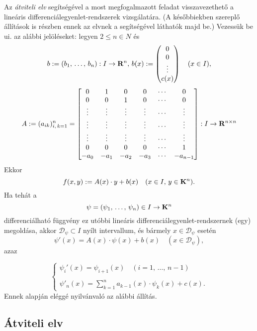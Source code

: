 Az \textit{átviteli elv} segítségével a most megfogalmazott feladat visszavezethető a lineáris differenciálegyenlet-rendszerek vizsgálatára. (A későbbiekben szereplő állítások is részben ennek az elvnek a segítségével láthatók majd be.) Vezessük be ui. az alábbi jelöléseket: legyen $2 \leq n \in N$ és
\[
	b := (b_1, \, \dots, \, b_n) : I \to \mathbf{R}^n, \, b(x) := \begin{pmatrix}
		0 \\
		0 \\
		\vdots \\
		c(x)
	\end{pmatrix} \quad (x \in I),
\]
\[
	A := (a_{ik})_{i, \, k = 1}^n = \begin{bmatrix}
		0 & 1 & 0 & 0 & \cdots & 0 \\
		0 & 0 & 1 & 0 & \cdots & 0 \\
		\vdots & \vdots & \vdots & \vdots & \cdots & \vdots \\
		\vdots & \vdots & \vdots & \vdots & \cdots & \vdots \\
		\vdots & \vdots & \vdots & \vdots & \cdots & \vdots \\
		0 & 0 & 0 & 0 & \cdots & 1 \\
		-a_0 & -a_1 & -a_2 & -a_3 & \cdots & -a_{n-1}
	\end{bmatrix} : I \to \mathbf{R}^{n \times n}
\]
Ekkor
\[
	f(x, y) := A(x) \cdot y + b(x) \quad (x \in I, \, y \in \mathbf{K}^n).
\]
Ha tehát a
\[
	\psi = (\psi_1, \, \dots, \, \psi_n) \in I \to \mathbf{K}^n
\]
differenciálható függvény ez utóbbi lineáris differenciálegyenlet-rendszernek (egy) megoldása, akkor $\mathcal{D}_\psi \subset I$ nyílt intervallum, és bármely $x \in \mathcal{D}_\psi$ esetén
\[
	\psi'(x) = A(x) \cdot \psi(x) + b(x) \quad (x \in \mathcal{D}_\psi),
\]
azaz

\begin{equation}
	\begin{cases}
		\psi_i'(x) = \psi_{i+1}(x) \quad (i = 1, \, \dots, \, n-1)\\
		\\
		\displaystyle \psi'_n(x) = \sum_{k=1}^n a_{k-1}(x) \cdot \psi_k(x) + c(x).
	\end{cases}
	\tag{$\star$}
\end{equation}
Ennek alapján eléggé nyilvánvaló az alábbi állítás.\\

\subsection{Átviteli elv}

